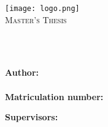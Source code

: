 \documentclass[
12pt, %
oneside, %
english, %
singlespacing, %
liststotoc, %
headsepline, %
]{MastersDoctoralThesis} %
\author{Yourname \textsc{Surname}} %
\begin{document}


\frontmatter %

\pagestyle{plain} %

\begin{titlepage}
\begin{center}


\texttt{[image: logo.png]} \\
\vspace*{1cm}
\textsc{\Large Master's Thesis}\\[0.5cm] %

\HRule \\[0.4cm] %
{\LARGE \bfseries \ttitle\par}\vspace{0.4cm} %
\HRule \\[1.5cm] %
 
\begin{minipage}[t]{0.5\textwidth}
\begin{flushleft} \large
{\bfseries{Author:}}\\
{\authorname} \\ %
\vspace*{.02\textheight}
{\bfseries Matriculation number:}\\
{\myid}
\end{flushleft}
\end{minipage}
\begin{minipage}[t]{0.4\textwidth}
\begin{flushright} \large 
{\bfseries Supervisors:} \\
{\firstsupname} \\
{\secondsupname}%
\end{flushright}
\end{minipage}\\[3cm]
 

\end{center}
\end{titlepage}
\end{document}
